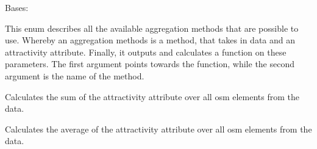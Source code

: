\documentclass[letterpaper,10pt,english]{sphinxmanual}
\begin{document}
\begin{fulllineitems}
\label{\detokenize{apidoc/src.osm_configurator.model.project.calculation:src.osm_configurator.model.project.calculation.aggregation_method_enum.AggregationMethod}}
\pysigstartsignatures
{}
\pysigstopsignatures
\sphinxAtStartPar
Bases: 

\sphinxAtStartPar
This enum describes all the available aggregation methods that are possible to use.
Whereby an aggregation methods is a method, that takes in data and an attractivity attribute. Finally, it outputs
and calculates a function on these parameters.
The first argument points towards the function, while the second argument is the name of the method.

\begin{fulllineitems}
\label{\detokenize{apidoc/src.osm_configurator.model.project.calculation:src.osm_configurator.model.project.calculation.aggregation_method_enum.AggregationMethod.SUM}}
\pysigstartsignatures
{}
\pysigstopsignatures
\sphinxAtStartPar
Calculates the sum of the attractivity attribute over all osm elements from the data.

\end{fulllineitems}


\begin{fulllineitems}
\label{\detokenize{apidoc/src.osm_configurator.model.project.calculation:src.osm_configurator.model.project.calculation.aggregation_method_enum.AggregationMethod.AVERAGE}}
\pysigstartsignatures
{}
\pysigstopsignatures
\sphinxAtStartPar
Calculates the average of the attractivity attribute over all osm elements from the data.


\end{fulllineitems}
\end{fulllineitems}
\end{document}
